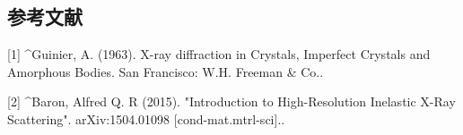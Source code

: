 \subsection{参考文献}
[1]
^Guinier, A. (1963). X-ray diffraction in Crystals, Imperfect Crystals and Amorphous Bodies. San Francisco: W.H. Freeman & Co..

[2]
^Baron, Alfred Q. R (2015). "Introduction to High-Resolution Inelastic X-Ray Scattering". arXiv:1504.01098 [cond-mat.mtrl-sci]..